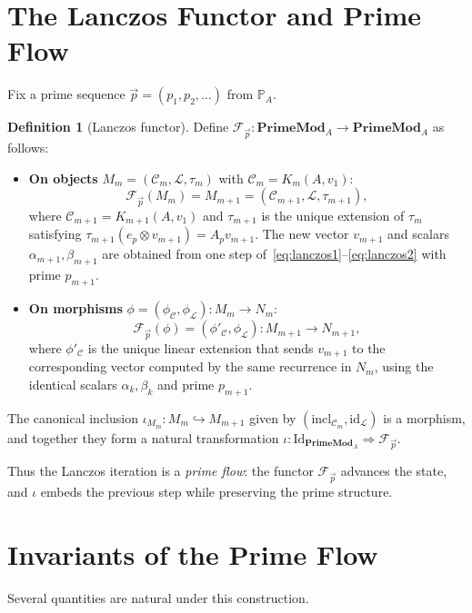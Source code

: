 \documentclass[12pt]{article}
\theoremstyle{plain}
\theoremstyle{definition}
\newtheorem{definition}[theorem]{Definition}
\theoremstyle{remark}
\begin{document}
\section{The Lanczos Functor and Prime Flow}\label{sec:functor}
Fix a prime sequence $\vec{p} = (p_1,p_2,\dots)$ from $\mathbb{P}_A$.

\begin{definition}[Lanczos functor]\label{def:functor}
Define $\mathcal{F}_{\vec{p}} : \mathbf{PrimeMod}_A \to \mathbf{PrimeMod}_A$ as follows:
\begin{itemize}
\item \textbf{On objects} $M_m = (\mathcal{C}_m,\mathcal{L},\tau_m)$ with $\mathcal{C}_m = K_m(A,v_1)$:
\[
\mathcal{F}_{\vec{p}}(M_m) = M_{m+1} = (\mathcal{C}_{m+1},\mathcal{L},\tau_{m+1}),
\]
where $\mathcal{C}_{m+1}=K_{m+1}(A,v_1)$ and $\tau_{m+1}$ is the unique extension of $\tau_m$ satisfying $\tau_{m+1}(e_p\otimes v_{m+1}) = A_p v_{m+1}$. 
The new vector $v_{m+1}$ and scalars $\alpha_{m+1},\beta_{m+1}$ are obtained from one step of~\eqref{eq:lanczos1}--\eqref{eq:lanczos2} with prime $p_{m+1}$.

\item \textbf{On morphisms} $\phi = (\phi_{\mathcal{C}},\phi_{\mathcal{L}}) : M_m \to N_m$:
\[
\mathcal{F}_{\vec{p}}(\phi) = (\phi'_{\mathcal{C}},\phi_{\mathcal{L}}) : M_{m+1} \to N_{m+1},
\]
where $\phi'_{\mathcal{C}}$ is the unique linear extension that sends $v_{m+1}$ to the corresponding vector computed by the same recurrence in $N_m$, using the identical scalars $\alpha_k,\beta_k$ and prime $p_{m+1}$.
\end{itemize}
\end{definition}

The canonical inclusion $\iota_{M_m} : M_m \hookrightarrow M_{m+1}$ given by $(\mathrm{incl}_{\mathcal{C}_m}, \mathrm{id}_{\mathcal{L}})$ is a morphism, and together they form a natural transformation $\iota : \mathrm{Id}_{\mathbf{PrimeMod}_A} \Rightarrow \mathcal{F}_{\vec{p}}$.

Thus the Lanczos iteration is a \emph{prime flow}: the functor $\mathcal{F}_{\vec{p}}$ advances the state, and $\iota$ embeds the previous step while preserving the prime structure.

\section{Invariants of the Prime Flow}\label{sec:invariants}
Several quantities are natural under this construction.
\end{document}

